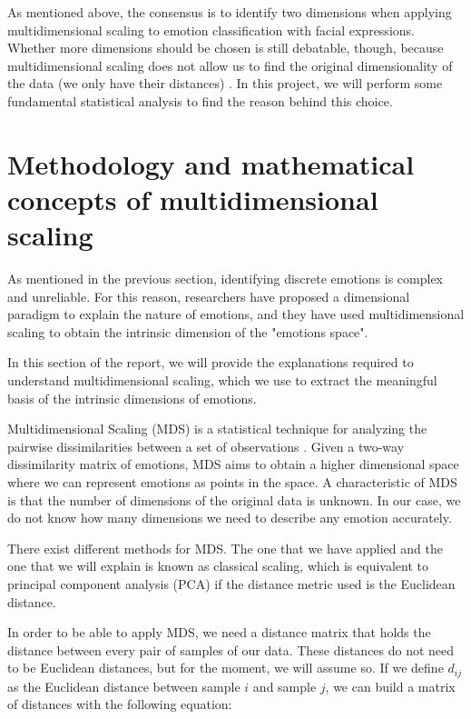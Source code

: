 \documentclass[11pt, a4paper]{article}
\numberwithin{equation}{subsection}
\begin{document}
As mentioned above, the consensus is to identify two dimensions when applying multidimensional scaling to emotion classification with facial expressions. Whether more dimensions should be chosen is still debatable, though, because multidimensional scaling does not allow us to find the original dimensionality of the data (we only have their distances) \cite{izenman2008modern}. In this project, we will perform some fundamental statistical analysis to find the reason behind this choice.


\section{Methodology and mathematical concepts of multidimensional scaling}\label{sect:mds_explanation}

As mentioned in the previous section, identifying discrete emotions is complex and unreliable. For this reason, researchers have proposed a dimensional paradigm to explain the nature of emotions, and they have used multidimensional scaling to obtain the intrinsic dimension of the "emotions space".

In this section of the report, we will provide the explanations required to understand multidimensional scaling, which we use to extract the meaningful basis of the intrinsic dimensions of emotions.

Multidimensional Scaling (MDS) is a statistical technique for analyzing the pairwise dissimilarities between a set of observations \cite{izenman2008modern}. Given a two-way dissimilarity matrix of emotions, MDS aims to obtain a higher dimensional space where we can represent emotions as points in the space. A characteristic of MDS is that the number of dimensions of the original data is unknown. In our case, we do not know how many dimensions we need to describe any emotion accurately.

There exist different methods for MDS. The one that we have applied and the one that we will explain is known as classical scaling, which is equivalent to principal component analysis (PCA) if the distance metric used is the Euclidean distance.

In order to be able to apply MDS, we need a distance matrix that holds the distance between every pair of samples of our data. These distances do not need to be Euclidean distances, but for the moment, we will assume so. If we define $d_{ij}$ as the Euclidean distance between sample $i$ and sample $j$, we can build a matrix of distances with the following equation:
\end{document}
